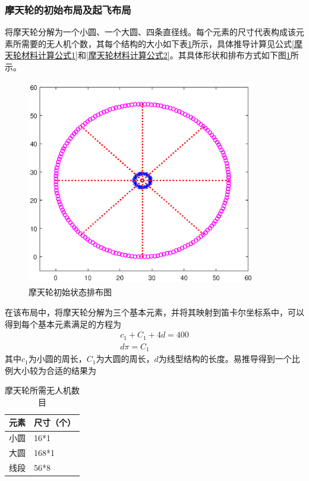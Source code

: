 \documentclass[UTF8,12pt]{ctexart}
\begin{document}
\subsubsection{摩天轮的初始布局及起飞布局}
将摩天轮分解为一个小圆、一个大圆、四条直径线。每个元素的尺寸代表构成该元素所需要的无人机个数，其每个结构的大小如下表\ref{摩天轮所需无人机数目}所示，具体推导计算见公式\eqref{摩天轮材料计算公式1}和\eqref{摩天轮材料计算公式2}。其具体形状和排布方式如下图\ref{摩天轮初始状态}所示。
\begin{figure}[ht]
    \centering
    \includegraphics[height=9.0cm, width=10.0cm]{img/draw_sky_wheel.eps}
    \caption{摩天轮初始状态排布图}
    \label{摩天轮初始状态}
\end{figure}
在该布局中，将摩天轮分解为三个基本元素，并将其映射到笛卡尔坐标系中，可以得到每个基本元素满足的方程为
\begin{gather}
    \label{摩天轮材料计算公式1}
    c_1+C_1+4d=400\\
    \label{摩天轮材料计算公式2}
    d\pi=C_1
\end{gather}
其中$c_1$为小圆的周长，$C_1$为大圆的周长，$d$为线型结构的长度。易推导得到一个比例大小较为合适的结果为
\begin{table}[h]
    \vspace{20pt}
    \centering
    \caption{摩天轮所需无人机数目}
    \begin{tabular}{p{2cm}p{3cm}}
        \hline
        元素            &   尺寸（个） \\
        \hline 
        小圆            &   16*1 \\
        大圆            &   168*1 \\
        线段            &   56*8 \\
        \hline
    \end{tabular}
    \label{摩天轮所需无人机数目}
\end{table}
\end{document}
